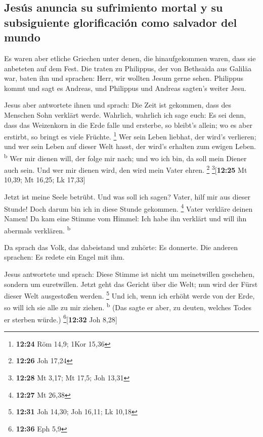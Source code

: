 \hypertarget{jesuxfas-anuncia-su-sufrimiento-mortal-y-su-subsiguiente-glorificaciuxf3n-como-salvador-del-mundo}{%
\subsection{Jesús anuncia su sufrimiento mortal y su subsiguiente
glorificación como salvador del
mundo}\label{jesuxfas-anuncia-su-sufrimiento-mortal-y-su-subsiguiente-glorificaciuxf3n-como-salvador-del-mundo}}

 Es waren aber etliche Griechen unter denen, die
hinaufgekommen waren, dass sie anbeteten auf dem Fest. 
Die traten zu Philippus, der von Bethsaida aus Galiläa war, baten ihn
und sprachen: Herr, wir wollten Jesum gerne sehen. 
Philippus kommt und sagt es Andreas, und Philippus und Andreas sagten's
weiter Jesu.

 Jesus aber antwortete ihnen und sprach: Die Zeit ist
gekommen, dass des Menschen Sohn verklärt werde. 
Wahrlich, wahrlich ich sage euch: Es sei denn, dass das Weizenkorn in
die Erde falle und ersterbe, so bleibt's allein; wo es aber erstirbt, so
bringt es viele Früchte. \footnote{\textbf{12:24} Röm 14,9; 1Kor 15,36}
 Wer sein Leben liebhat, der wird's verlieren; und wer
sein Leben auf dieser Welt hasst, der wird's erhalten zum ewigen Leben.
\textsuperscript{b}  Wer mir dienen will, der folge mir
nach; und wo ich bin, da soll mein Diener auch sein. Und wer mir dienen
wird, den wird mein Vater ehren. \footnote{\textbf{12:26} Joh 17,24}
\footnote{\textbf{12:28} Mt 3,17; Mt 17,5; Joh 13,31}{[}\textbf{12:25}
Mt 10,39; Mt 16,25; Lk 17,33{]}

 Jetzt ist meine Seele betrübt. Und was soll ich sagen?
Vater, hilf mir aus dieser Stunde! Doch darum bin ich in diese Stunde
gekommen. \footnote{\textbf{12:27} Mt 26,38}  Vater
verkläre deinen Namen! Da kam eine Stimme vom Himmel: Ich habe ihn
verklärt und will ihn abermals verklären. \textsuperscript{b}

 Da sprach das Volk, das dabeistand und zuhörte: Es
donnerte. Die anderen sprachen: Es redete ein Engel mit ihm.

 Jesus antwortete und sprach: Diese Stimme ist nicht um
meinetwillen geschehen, sondern um euretwillen.  Jetzt
geht das Gericht über die Welt; nun wird der Fürst dieser Welt
ausgestoßen werden. \footnote{\textbf{12:31} Joh 14,30; Joh 16,11; Lk
  10,18}  Und ich, wenn ich erhöht werde von der Erde, so
will ich sie alle zu mir ziehen. \textsuperscript{b} 
(Das sagte er aber, zu deuten, welches Todes er sterben würde.)
\footnote{\textbf{12:36} Eph 5,9}{[}\textbf{12:32} Joh 8,28{]}

